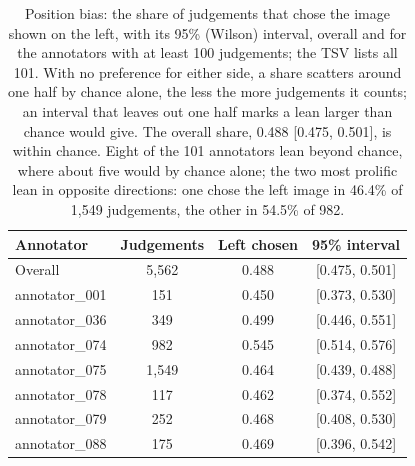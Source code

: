 \begin{table}[htbp]
  \centering
  \caption{Position bias: the share of judgements that chose the image shown on the left, with its 95\% (Wilson) interval, overall and for the annotators with at least 100 judgements; the TSV lists all 101. With no preference for either side, a share scatters around one half by chance alone, the less the more judgements it counts; an interval that leaves out one half marks a lean larger than chance would give. The overall share, 0.488 [0.475, 0.501], is within chance. Eight of the 101 annotators lean beyond chance, where about five would by chance alone; the two most prolific lean in opposite directions: one chose the left image in 46.4\% of 1,549 judgements, the other in 54.5\% of 982.}
  \label{tab:position_bias}
  \begin{tabular}{lccc}
    \toprule
    Annotator & Judgements & Left chosen & 95\% interval \\
    \midrule
    Overall & 5,562 & 0.488 & [0.475, 0.501] \\
    \midrule
    annotator\_001 & 151 & 0.450 & [0.373, 0.530] \\
    annotator\_036 & 349 & 0.499 & [0.446, 0.551] \\
    annotator\_074 & 982 & 0.545 & [0.514, 0.576] \\
    annotator\_075 & 1,549 & 0.464 & [0.439, 0.488] \\
    annotator\_078 & 117 & 0.462 & [0.374, 0.552] \\
    annotator\_079 & 252 & 0.468 & [0.408, 0.530] \\
    annotator\_088 & 175 & 0.469 & [0.396, 0.542] \\
    \bottomrule
  \end{tabular}
\end{table}
